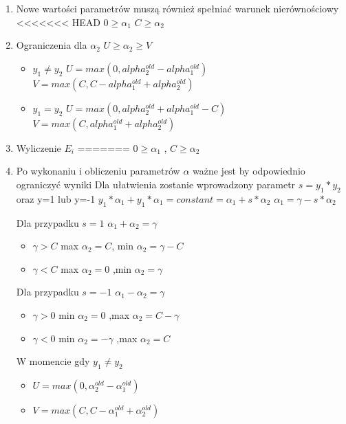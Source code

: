 \documentclass[[10pt,a4paper]{article}
\begin{document}
\begin{enumerate}
\begin{itemize}
\begin{enumerate}
\item Nowe wartości parametrów muszą również spełniać warunek nierównościowy
<<<<<<< HEAD
$0\ge\alpha_{1}$
$C\ge\alpha_{2}$
\item Ograniczenia dla $\alpha_{2}$
$ U \ge\alpha_{2}\ge V $
\begin{itemize}
\item $y_{1}\neq y_{2}$
\newline
 $ U = max(0,alpha_{2}^{old} - alpha_{1}^{old})$
 \newline
 $ V = max(C,C - alpha_{1}^{old} + alpha_{2}^{old})$
\item $y_{1}=y_{2}$
\newline
$ U = max(0,alpha_{2}^{old} + alpha_{1}^{old} - C)$
\newline
 $ V = max(C, alpha_{1}^{old} + alpha_{2}^{old})$
 
\end{itemize}
\item Wyliczenie $E_i$
=======
$0\ge\alpha_{1}$ ,
$C\ge\alpha_{2}$
\item Po wykonaniu i obliczeniu parametrów  $\alpha$ ważne jest by odpowiednio ograniczyć wyniki
\newline 
Dla ułatwienia zostanie wprowadzony parametr $s=y_{1}*y_{2}$ oraz y=1 lub y=-1 
\newline 
$y_{1}*\alpha_{1} + y_{1}*\alpha_{1} = constant = \alpha_{1} + s*\alpha_{2}$
\newline
$\alpha_{1} = \gamma - s*\alpha_{2}$

Dla przypadku $s=1$   
 \newline $\alpha_{1}+\alpha_{2} = \gamma$
 \begin{itemize}
\item $\gamma > C $ max $\alpha_{2} = C $, min $ \alpha_{2} = \gamma - C$
\item $\gamma < C$  max $\alpha_{2} = 0$ ,min  $\alpha_{2} = \gamma$
\end{itemize}
Dla przypadku $s=-1$
\newline $\alpha_{1}-\alpha_{2} = \gamma$
\begin{itemize}
\item $\gamma > 0$ min $\alpha_{2} = 0 $ ,max  $\alpha_{2} = C -\gamma $
\item $\gamma < 0$ min $\alpha_{2} = -\gamma$ ,max  $\alpha_{2} = C$
\end{itemize}
W momencie gdy  $y_{1}\neq y_{2}$ 
\begin{itemize}
 \item$ U = max(0,\alpha_{2}^{old} - \alpha_{1}^{old})$
 \item$ V = max(C,C - \alpha_{1}^{old} + \alpha_{2}^{old})$
 \end{itemize}



\end{enumerate}
\end{itemize}
\end{enumerate}
\end{document}

